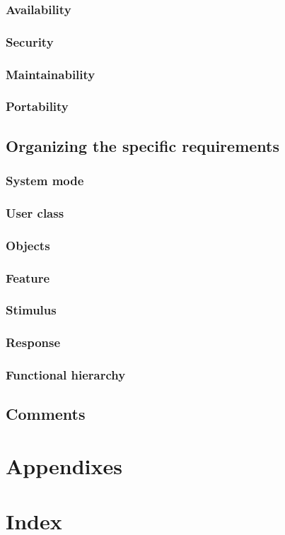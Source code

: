 \documentclass[draftclsnofoot,onecolumn,letterpaper,10pt,compsoc]{IEEEtran}
\begin{document}
		\subsubsection{Availability}
		\subsubsection{Security}
		\subsubsection{Maintainability}
		\subsubsection{Portability}
	\subsection{Organizing the specific requirements}
		\subsubsection{System mode}
		\subsubsection{User class}
		\subsubsection{Objects}
		\subsubsection{Feature}
		\subsubsection{Stimulus}
		\subsubsection{Response}
		\subsubsection{Functional hierarchy}
	\subsection{Comments}
\section{Appendixes}
\section{Index}

\pagebreak

\end{document}
